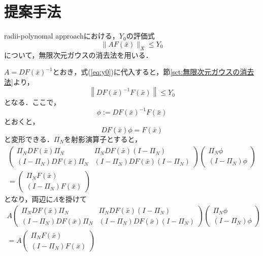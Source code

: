 \documentclass[11pt,a4paper,titlepage]{jsreport}
\theoremstyle{definition}
\begin{document}
\newpage
\chapter{提案手法}

radii-polynomal approachにおける，$Y_0$の評価式
\begin{equation}
  \label{eq:y0}
  \|AF(\bar{x})\|_X \leq Y_0
\end{equation}
について，無限次元ガウスの消去法を用いる．

$A=DF(\bar{x})^{-1}$とおき，式(\ref{eq:y0})に代入すると，節\ref{sct:無限次元ガウスの消去法}より，
\begin{equation}
  \left \| DF(\bar{x})^{-1} F(\bar{x}) \right \| \leq Y_0
\end{equation}
となる．ここで，
\begin{equation*}
  \phi:=DF(\bar{x})^{-1} F(\bar{x})
\end{equation*}
とおくと，
\begin{equation*}
  DF(\bar{x}) \phi = F(\bar{x})
\end{equation*}
と変形できる．$\Pi_N$を射影演算子とすると，
\begin{equation}
    \begin{split}
    \begin{pmatrix}
      \Pi_N DF(\bar{x}) \Pi_N & \Pi_N DF(\bar{x}) (I-\Pi_N) \\
      (I-\Pi_N) DF(\bar{x}) \Pi_N & (I-\Pi_N) DF(\bar{x}) (I-\Pi_N)
    \end{pmatrix}
    \begin{pmatrix}
      \Pi_N \phi \\
      (I-\Pi_N) \phi
    \end{pmatrix}
    \\=
    \begin{pmatrix}
      \Pi_N F(\bar{x}) \\
      (I - \Pi_N) F(\bar{x})
    \end{pmatrix}
  \end{split}
\end{equation}
となり，両辺に$A$を掛けて
\begin{equation}
  \label{eq:y0-1}
  \begin{split}
  A
    \begin{pmatrix}
      \Pi_N DF(\bar{x}) \Pi_N & \Pi_N DF(\bar{x}) (I-\Pi_N) \\
      (I-\Pi_N) DF(\bar{x}) \Pi_N & (I-\Pi_N) DF(\bar{x}) (I-\Pi_N)
    \end{pmatrix}
    \begin{pmatrix}
      \Pi_N \phi \\
      (I-\Pi_N) \phi
    \end{pmatrix}
    \\=A
    \begin{pmatrix}
      \Pi_N F(\bar{x}) \\
      (I - \Pi_N) F(\bar{x})
    \end{pmatrix}
  \end{split}
\end{equation}
\end{document}
